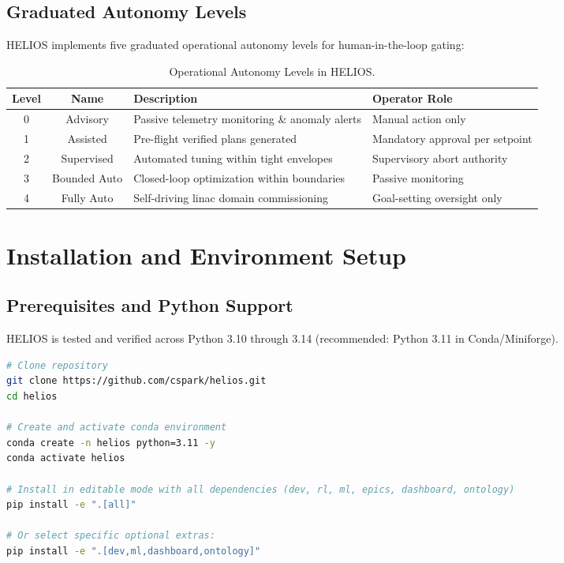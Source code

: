 \documentclass[11pt,a4paper]{report}
\begin{document}
\section{Graduated Autonomy Levels}
HELIOS implements five graduated operational autonomy levels for human-in-the-loop gating:
\begin{table}[h!]
\centering
\begin{tabularx}{\textwidth}{ccp{6.5cm}X}
\toprule
\textbf{Level} & \textbf{Name} & \textbf{Description} & \textbf{Operator Role} \\
\midrule
0 & Advisory & Passive telemetry monitoring \& anomaly alerts & Manual action only \\
1 & Assisted & Pre-flight verified plans generated & Mandatory approval per setpoint \\
2 & Supervised & Automated tuning within tight envelopes & Supervisory abort authority \\
3 & Bounded Auto & Closed-loop optimization within boundaries & Passive monitoring \\
4 & Fully Auto & Self-driving linac domain commissioning & Goal-setting oversight only \\
\bottomrule
\end{tabularx}
\caption{Operational Autonomy Levels in HELIOS.}
\end{table}

\chapter{Installation and Environment Setup}

\section{Prerequisites and Python Support}
HELIOS is tested and verified across Python 3.10 through 3.14 (recommended: Python 3.11 in Conda/Miniforge).

\begin{lstlisting}[language=bash]
# Clone repository
git clone https://github.com/cspark/helios.git
cd helios

# Create and activate conda environment
conda create -n helios python=3.11 -y
conda activate helios

# Install in editable mode with all dependencies (dev, rl, ml, epics, dashboard, ontology)
pip install -e ".[all]"

# Or select specific optional extras:
pip install -e ".[dev,ml,dashboard,ontology]"
\end{lstlisting}
\end{document}
